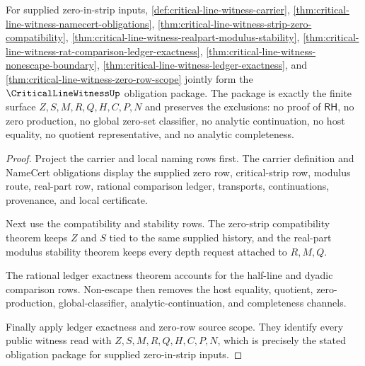 \begin{theorem}
\label{thm:critical-line-witness-obligation-closure-package}
For supplied zero-in-strip inputs, \autoref{def:critical-line-witness-carrier},
\autoref{thm:critical-line-witness-namecert-obligations},
\autoref{thm:critical-line-witness-strip-zero-compatibility},
\autoref{thm:critical-line-witness-realpart-modulus-stability},
\autoref{thm:critical-line-witness-rat-comparison-ledger-exactness},
\autoref{thm:critical-line-witness-nonescape-boundary},
\autoref{thm:critical-line-witness-ledger-exactness}, and
\autoref{thm:critical-line-witness-zero-row-scope} jointly form the
$\CriticalLineWitnessUp$ obligation package. The package is exactly the finite
surface $Z,S,M,R,Q,H,C,P,N$ and preserves the exclusions: no proof of
$\mathsf{RH}$, no zero production, no global zero-set classifier, no analytic
continuation, no host equality, no quotient representative, and no analytic
completeness.
\end{theorem}
\begin{proof}
Project the carrier and local naming rows first. The carrier definition and
NameCert obligations display the supplied zero row, critical-strip row,
modulus route, real-part row, rational comparison ledger, transports,
continuations, provenance, and local certificate.

Next use the compatibility and stability rows. The zero-strip compatibility
theorem keeps $Z$ and $S$ tied to the same supplied history, and the real-part
modulus stability theorem keeps every depth request attached to $R,M,Q$.

The rational ledger exactness theorem accounts for the half-line and dyadic
comparison rows. Non-escape then removes the host equality, quotient,
zero-production, global-classifier, analytic-continuation, and completeness
channels.

Finally apply ledger exactness and zero-row source scope. They identify every
public witness read with $Z,S,M,R,Q,H,C,P,N$, which is precisely the stated
obligation package for supplied zero-in-strip inputs.
\end{proof}


